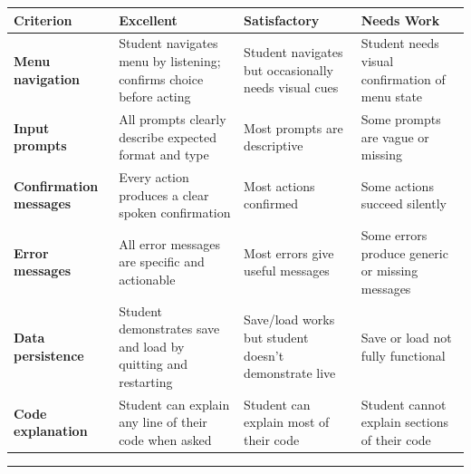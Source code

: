 \documentclass[
  justified,
  openright,
]{tufte-book}
\begin{document}
{\def\LTcaptype{none} %
\begin{longtable}[]{@{}
  >{\raggedright\arraybackslash}p{}
  >{\raggedright\arraybackslash}p{}
  >{\raggedright\arraybackslash}p{}
  >{\raggedright\arraybackslash}p{}@{}}
\toprule\noalign{}
\begin{minipage}[b]{\linewidth}\raggedright
Criterion
\end{minipage} & \begin{minipage}[b]{\linewidth}\raggedright
Excellent
\end{minipage} & \begin{minipage}[b]{\linewidth}\raggedright
Satisfactory
\end{minipage} & \begin{minipage}[b]{\linewidth}\raggedright
Needs Work
\end{minipage} \\
\midrule\noalign{}
\endhead
\bottomrule\noalign{}
\endlastfoot
\textbf{Menu navigation} & Student navigates menu by listening; confirms
choice before acting & Student navigates but occasionally needs visual
cues & Student needs visual confirmation of menu state \\
\textbf{Input prompts} & All prompts clearly describe expected format
and type & Most prompts are descriptive & Some prompts are vague or
missing \\
\textbf{Confirmation messages} & Every action produces a clear spoken
confirmation & Most actions confirmed & Some actions succeed silently \\
\textbf{Error messages} & All error messages are specific and actionable
& Most errors give useful messages & Some errors produce generic or
missing messages \\
\textbf{Data persistence} & Student demonstrates save and load by
quitting and restarting & Save/load works but student doesn't
demonstrate live & Save or load not fully functional \\
\textbf{Code explanation} & Student can explain any line of their code
when asked & Student can explain most of their code & Student cannot
explain sections of their code \\
\end{longtable}
}

\begin{center}\rule{0.5\linewidth}{0.5pt}\end{center}
\end{document}
